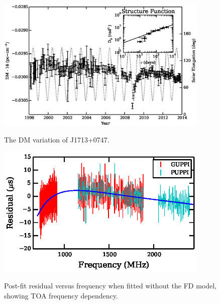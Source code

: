 \documentclass[12pt,preprint]{aastex}
\begin{document}


\begin{figure}
\includegraphics[width=4in]{DMX.ps} \\ 
\caption {\label{fig:dmx} The DM variation of J1713+0747.} 
\end{figure} 

\begin{figure}
\includegraphics[width=4in]{FD.ps} \\ 
\caption {\label{fig:FD} Post-fit residual versus frequency when fitted
without the FD model, showing TOA frequency dependency.} 
\end{figure} 
\end{document}
